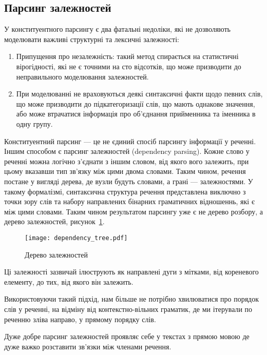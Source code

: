 \subsection{Парсинг залежностей}
У конституентного парсингу є два фатальні недоліки, які не дозволяють
моделювати важливі структурні та лексичні залежності:
\begin{enumerate}
    \item Припущення про незалежність: такий метод спирається на статистичні
    вірогідності, які не є точними на сто відсотків, що може призводити до
    неправильного моделювання залежностей.
    \item При моделюванні не враховуються деякі синтаксичні факти щодо певних слів,
    що може призводити до підкатегоризації слів, що мають однакове значення,
    або може втрачатися інформація про об'єднання прийменника та іменника
    в одну групу.
\end{enumerate}

Конституентний парсинг --- це не єдиний спосіб парсингу інформації у реченні.
Іншим способом є парсинг залежностей (dependency parsing). Кожне слово у
реченні можна логічно з'єднати з іншим словом, від якого вого залежить,
при цьому вказавши тип зв'язку між цими двома словами. Таким чином, речення
постане у вигляді дерева, де вузли будуть словами, а грані --- залежностями.
У такому формалізмі, синтаксична структура речення представлена
виключно з точки зору слів та набору направлених бінарних граматичних відношеннь,
які є між цими словами. Таким чином результатом парсингу уже є не дерево розбору,
а дерево залежностей, рисунок~\ref{img:dependency_tree}.
\begin{figure}[ht]
  \begin{center}
    \texttt{[image: dependency\_tree.pdf]}
  \end{center}
  \caption{Дерево залежностей}
  \label{img:dependency_tree}
\end{figure}

Ці залежності зазвичай ілюструють як направлені дуги з мітками, від кореневого
елементу, до тих, від якого він залежить.

Використовуючи такий підхід, нам більше не потрібно хвилюватися про
порядок слів у реченні, на відміну від контекстно-вільних граматик, де ми
ітерували по реченню зліва направо, у прямому порядку слів.

Дуже добре парсинг залежностей проявляє себе у текстах з прямою мовою
де дуже важко розставити зв'язки між членами речення.

